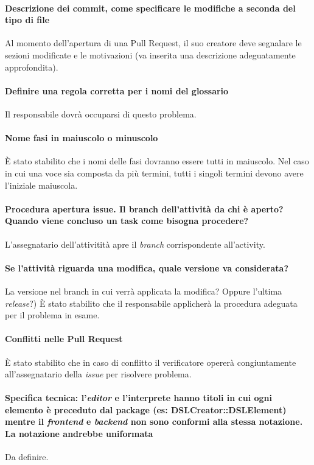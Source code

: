 \documentclass[11pt]{meetingmins}
\begin{document}
	\paragraph*{Descrizione dei commit, come specificare le modifiche a seconda del tipo di file}
		Al momento dell'apertura di una Pull Request, il suo creatore deve segnalare le sezioni modificate e
		le motivazioni (va inserita una descrizione adeguatamente approfondita).

	\paragraph*{Definire una regola corretta per i nomi del glossario}
		Il responsabile dovr\`a occuparsi di questo problema.

	\paragraph*{Nome fasi in maiuscolo o minuscolo}
		\`E stato stabilito che i nomi delle fasi dovranno essere tutti in maiuscolo.		
		Nel caso in cui una voce sia composta da pi\`u termini, tutti i singoli termini devono avere l'iniziale maiuscola.

	\paragraph*{Procedura apertura issue. Il branch dell'attivit\`a da chi \`e aperto? Quando viene concluso un task come bisogna procedere?}
		L'assegnatario dell'attivitit\`a apre il \textit{branch} corrispondente all'activity.				

	\paragraph*{Se l'attivit\`a riguarda una modifica, quale versione va considerata?}
		La versione nel branch in cui verr\`a applicata la modifica? Oppure l'ultima \textit{release}?)
		\`E stato stabilito che il responsabile applicher\`a la procedura adeguata per il problema in esame.	

	\paragraph*{Conflitti nelle Pull Request}
		\`E stato stabilito che in caso di conflitto il verificatore operer\`a congiuntamente all'assegnatario della
		\textit{issue} per risolvere problema.		
	        

	\paragraph*{\textbf{Specifica tecnica}: l'\textit{editor} e l'interprete hanno titoli in cui ogni elemento è preceduto 
		dal package (es: DSLCreator::DSLElement) mentre il \textit{frontend} e \textit{backend} 
		non sono conformi alla stessa notazione. La notazione andrebbe uniformata}
		Da definire.
		
\end{document}
